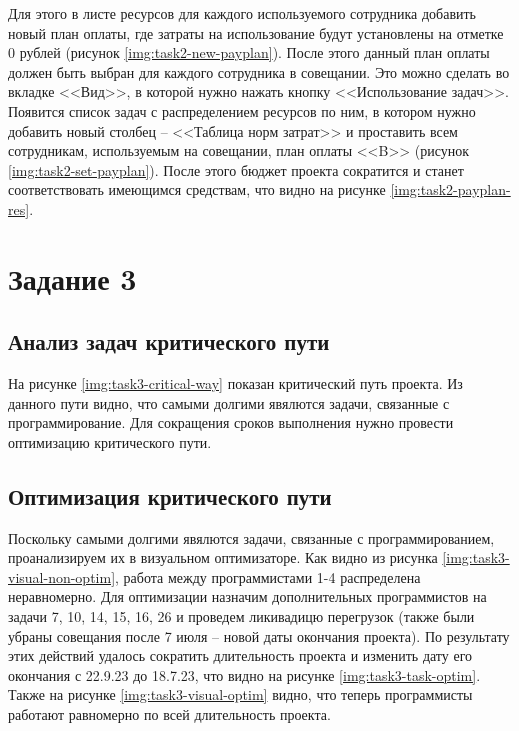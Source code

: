 Для этого в листе ресурсов для каждого используемого сотрудника добавить новый план оплаты, где затраты на использование будут установлены на отметке 0 рублей (рисунок \ref{img:task2-new-payplan}). После этого данный план оплаты должен быть выбран для каждого сотрудника в совещании. Это можно сделать во вкладке <<Вид>>, в которой нужно нажать кнопку <<Использование задач>>. Появится список задач с распределением ресурсов по ним, в котором нужно добавить новый столбец -- <<Таблица норм затрат>> и проставить всем сотрудникам, используемым на совещании, план оплаты <<B>> (рисунок \ref{img:task2-set-payplan}). После этого бюджет проекта сократится и станет соответствовать имеющимся средствам, что видно на рисунке \ref{img:task2-payplan-res}.



\section{Задание 3}

\subsection{Анализ задач критического пути}

На рисунке \ref{img:task3-critical-way} показан критический путь проекта. Из данного пути видно, что самыми долгими явялются задачи, связанные с программирование. Для сокращения сроков выполнения нужно провести оптимизацию критического пути.



\subsection{Оптимизация критического пути}

Поскольку самыми долгими явялются задачи, связанные с программированием, проанализируем их в визуальном оптимизаторе. Как видно из рисунка \ref{img:task3-visual-non-optim}, работа между программистами 1-4 распределена неравномерно. Для оптимизации назначим дополнительных программистов на задачи 7, 10, 14, 15, 16, 26 и проведем ликивадицю перегрузок (также были убраны совещания после 7 июля -- новой даты окончания проекта). По результату этих действий удалось сократить длительность проекта и изменить дату его окончания с 22.9.23 до 18.7.23, что видно на рисунке \ref{img:task3-task-optim}. Также на рисунке \ref{img:task3-visual-optim} видно, что теперь программисты работают равномерно по всей длительность проекта.


